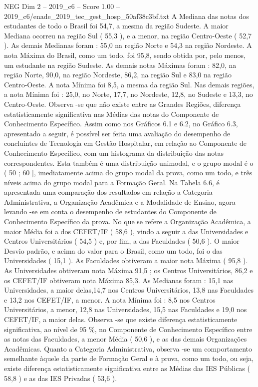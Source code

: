 \begin{textsample}{NEG Dim 2 – 2019\_c6 – Score 1.00 – 2019\_c6/enade\_2019\_tec\_gest\_hosp\_50af38c3bf.txt}
A Mediana das notas dos estudantes de todo o Brasil foi 54,7, a mesma da região Sudeste.
A maior Mediana ocorreu na região Sul ( 55,3 ), e a menor, na região Centro-Oeste ( 52,7 ).
As demais Medianas foram : 55,0 na região Norte e 54,3 na região Nordeste.
A nota Máxima do Brasil, como um todo, foi 95,8, sendo obtida por, pelo menos, um estudante na região Sudeste.
As demais notas Máximas foram : 82,0, na região Norte, 90,0, na região Nordeste, 86,2, na região Sul e 83,0 na região Centro-Oeste.
A nota Mínima foi 8,5, a mesma da região Sul.
Nas demais regiões, a nota Mínima foi : 25,0, no Norte, 17,7, no Nordeste, 12,8, no Sudeste e 13,3, no Centro-Oeste.
Observa -se que não existe entre as Grandes Regiões, diferença estatisticamente significativa nas Médias das notas do Componente de Conhecimento Específico.
Assim como nos Gráficos 6.1 e 6.2, no Gráfico 6.3, apresentado a seguir, é possível ser feita uma avaliação do desempenho de concluintes de Tecnologia em Gestão Hospitalar, em relação ao Componente de Conhecimento Específico, com um histograma da distribuição das notas correspondentes.
Esta também é uma distribuição unimodal, e o grupo modal é o ( 50 ; 60 ], imediatamente acima do grupo modal da prova, como um todo, e três níveis acima do grupo modal para a Formação Geral.
Na Tabela 6.6, é apresentada uma comparação dos resultados em relação a Categoria Administrativa, a Organização Acadêmica e a Modalidade de Ensino, agora levando -se em conta o desempenho de estudantes do Componente de Conhecimento Específico da prova.
No que se refere a Organização Acadêmica, a maior Média foi a dos CEFET/IF ( 58,6 ), vindo a seguir a das Universidades e Centros Universitários ( 54,5 ) e, por fim, a das Faculdades ( 50,6 ).
O maior Desvio padrão, e acima do valor para o Brasil, como um todo, foi o das Universidades ( 15,1 ).
As Faculdades obtiveram a maior nota Máxima ( 95,8 ).
As Universidades obtiveram nota Máxima 91,5 ; os Centros Universitários, 86,2 e os CEFET/IF obtiveram nota Máxima 85,3.
As Medianas foram : 15,1 nas Universidades, a maior delas,14,7 nos Centros Universitários, 13,8 nas Faculdades e 13,2 nos CEFET/IF, a menor.
A nota Mínima foi : 8,5 nos Centros Universitários, a menor, 12,8 nas Universidades, 15,5 nas Faculdades e 19,0 nos CEFET/IF, a maior delas.
Observa -se que existe diferença estatisticamente significativa, ao nível de 95 \%, no Componente de Conhecimento Específico entre as notas das Faculdades, a menor Média ( 50,6 ), e as das demais Organizações Acadêmicas.
Quanto a Categoria Administrativa, observa -se um comportamento semelhante àquele da parte de Formação Geral e à prova, como um todo, ou seja, existe diferença estatisticamente significativa entre as Médias das IES Públicas ( 58,8 ) e as das IES Privadas ( 53,6 ).

\end{textsample}
